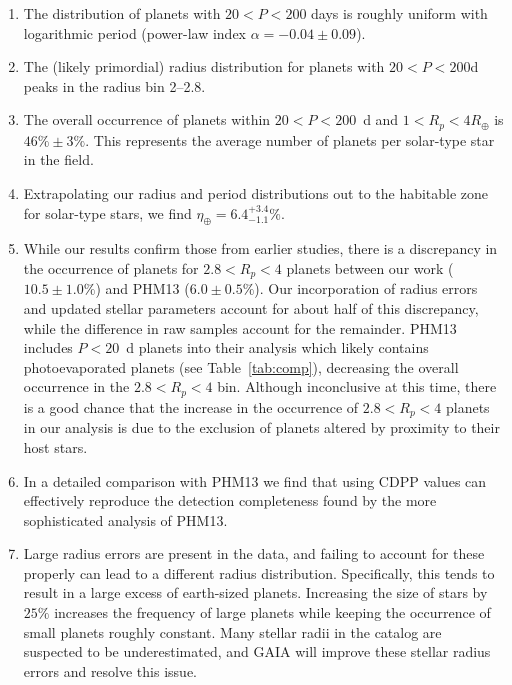 \begin{enumerate}

\item The distribution of planets with $20 < P < 200$ days is roughly uniform with
logarithmic period (power-law index $\alpha = -0.04 \pm 0.09$).

\item The (likely primordial) radius distribution for \kep{} planets
  with $20<P<200$d peaks in the radius bin 2--2.8\rearth{}. 
    
\item The overall occurrence of planets within $20<P<200$~d and
  $1<R_p<4$$R_\oplus$ is $46\% \pm 3\%$. This represents the average
  number of planets per solar-type star in the \kep{} field.

\item Extrapolating our radius and period distributions out to the
  habitable
  zone for solar-type stars, we find $\eta_{\oplus}=6.4^{+3.4}_{-1.1}\%$.\\

\item While our results confirm those from earlier studies, 
 there is a discrepancy in the occurrence of planets for $2.8<R_p<4$\rearth{} planets  
  between our work ($10.5 \pm 1.0\%$) and PHM13 ($6.0 \pm 0.5 \%$). Our incorporation of 
  radius errors and updated \citet{Huber2014} stellar parameters account for about half of this 
  discrepancy, while the difference in raw samples account for the remainder. 
  PHM13 includes $P<20$~d planets into their analysis which likely contains 
  photoevaporated planets (see Table~\ref{tab:comp}), decreasing the overall occurrence
  in the $2.8<R_p<4$\rearth{} bin. 
  Although inconclusive at this time, there is a good chance
  that the increase in the occurrence of $2.8<R_p<4$\rearth{} planets in our analysis 
  is due to the exclusion of planets altered by proximity to their host stars. 
  
 \item In a detailed comparison with PHM13 we find that using CDPP
 values can effectively reproduce the detection completeness found by 
 the more sophisticated analysis of PHM13.

\item Large radius errors are present in the \kep{} data, and failing
  to account for these properly can lead to a different radius
  distribution. Specifically, this tends to result in a large excess
  of earth-sized planets. Increasing the size of \kep{} stars by $25 \%$
  increases the frequency of large planets while keeping the occurrence
  of small planets roughly constant. Many stellar radii in the \kep{}
  catalog are suspected to be underestimated, and GAIA will improve
  these stellar radius errors and resolve this issue.
  
\end{enumerate}
